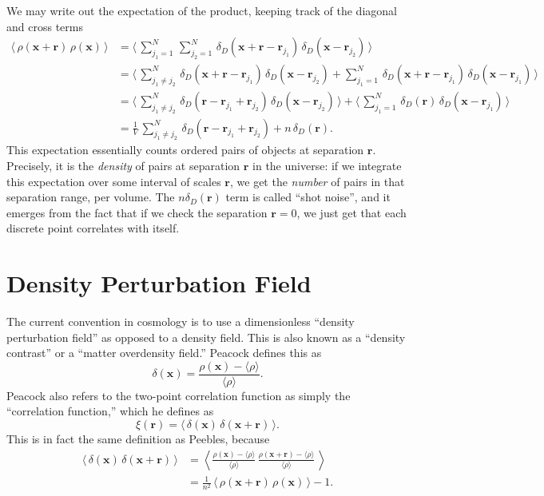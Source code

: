\documentclass{article}
\begin{document}
We may write out the expectation of the product, keeping track of the diagonal and cross terms
\begin{align*}
    \langle\,\rho(\mathbf{x}+\mathbf{r})\,\rho(\mathbf{x})\,\rangle&=\langle\,\sum_{j_1=1}^{N}\,\sum_{j_2=1}^{N}\,\delta_D(\mathbf{x}+\mathbf{r}-\mathbf{r}_{j_1})\,\delta_D(\mathbf{x}-\mathbf{r}_{j_2})\,\rangle\\
    &=\langle\,\sum_{j_1\neq j_2}^{N}\,\delta_D(\mathbf{x}+\mathbf{r}-\mathbf{r}_{j_1})\,\delta_D(\mathbf{x}-\mathbf{r}_{j_2})+\sum_{j_1=1}^{N}\,\delta_D(\mathbf{x}+\mathbf{r}-\mathbf{r}_{j_1})\,\delta_D(\mathbf{x}-\mathbf{r}_{j_1})\,\rangle\\
    &=\langle\,\sum_{j_1\neq j_2}^{N}\,\delta_D(\mathbf{r}-\mathbf{r}_{j_1}+\mathbf{r}_{j_2})\,\delta_D(\mathbf{x}-\mathbf{r}_{j_2})\,\rangle+\langle\,\sum_{j_1=1}^{N}\,\delta_D(\mathbf{r})\,\delta_D(\mathbf{x}-\mathbf{r}_{j_1})\,\rangle\\
    &=\frac{1}{V}\,\sum_{j_1\neq j_2}^{N}\,\delta_D(\mathbf{r}-\mathbf{r}_{j_1}+\mathbf{r}_{j_2})+n\,\delta_D(\mathbf{r}).
\end{align*}
This expectation essentially counts ordered pairs of objects at separation $\mathbf{r}$. Precisely, it is the \textit{density} of pairs at separation $\mathbf{r}$ in the universe: if we integrate this expectation over some interval of scales $\mathbf{r}$, we get the \textit{number} of pairs in that separation range, per volume. The $n\delta_D(\mathbf{r})$ term is called \enquote{shot noise}, and it emerges from the fact that if we check the separation $\mathbf{r}=0$, we just get that each discrete point correlates with itself. 

\section{Density Perturbation Field}
The current convention in cosmology is to use a dimensionless \enquote{density perturbation field} as opposed to a density field. 
This is also known as a \enquote{density contrast} or a \enquote{matter overdensity field.}
Peacock defines this as
\[
\delta(\mathbf{x})=\frac{\rho(\mathbf{x})-\langle\rho\rangle}{\langle\rho\rangle}.\tag{Peacock 16.1}
\]
Peacock also refers to the two-point correlation function as simply the \enquote{correlation function,} which he defines as
\[
\xi(\mathbf{r})=\langle\,\delta(\mathbf{x})\,\delta(\mathbf{x}+\mathbf{r})\,\rangle.\tag{Peacock 16.7}
\]
This is in fact the same definition as Peebles, because 
\begin{align*}
\langle\,\delta(\mathbf{x})\,\delta(\mathbf{x}+\mathbf{r})\,\rangle&=\left\langle\frac{\rho(\mathbf{x})-\langle\rho\rangle}{\langle\rho\rangle}\,\frac{\rho(\mathbf{x}+\mathbf{r})-\langle\rho\rangle}{\langle\rho\rangle}\,\right\rangle\\
&=\frac{1}{n^2}\,\langle\,\rho(\mathbf{x}+\mathbf{r})\,\rho(\mathbf{x})\,\rangle-1.
\end{align*}
\end{document}
